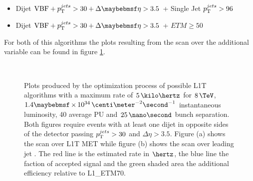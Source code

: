 \begin{itemize}
  \item Dijet $\text{VBF} + \pt^{jets}>30 + \Delta\eta>3.5$ + Single Jet $p_{\mathrm{T}}^{jets}>96$ 
  \item Dijet $\text{VBF} + \pt^{jets}>30 + \Delta\eta>3.5$ + $ETM \geq 50$
\end{itemize}

For both of this algorithms the plots resulting from the scan over the additional variable can be found in figure \ref{FIGURE:RunIIPreparation_L1TAlgorithmDevelopment_VariableScan}. 

\begin{figure}[!htp]%
\centering
{}\qquad
{}\\
\caption{Plots produced by the optimization process of possible \gls{L1T} algorithms with a maximum rate of $5\,\kilo\hertz$ for $8\,\TeV$, $1.4 \times 10^{34}\,\centi\meter^{-2}\second^{-1}$ instantaneous luminosity, 40 average \gls{PU} and $25\,\nano\second$ bunch separation. Both figures require events with at least one dijet in opposite sides of the detector passing $p_{\mathrm{T}}^{jets}>30$ and $\Delta\eta>3.5$. Figure (a) shows the scan over \gls{L1T} \gls{MET} while figure (b) shows the scan over leading jet \pt. The red line is the estimated rate in $\hertz$, the blue line the faction of accepted signal and the green shaded area the additional efficiency relative to L1\_ETM70.}
\label{FIGURE:RunIIPreparation_L1TAlgorithmDevelopment_VariableScan}
\end{figure}

